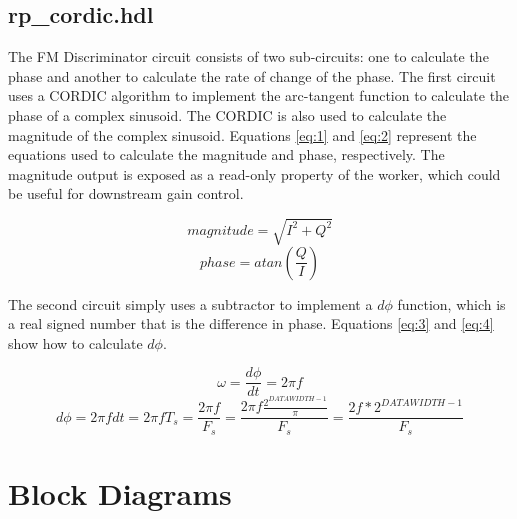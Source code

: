 \documentclass{article}
\def\comp{rp\_cordic}
\begin{document}
\subsection*{\comp.hdl}
The FM Discriminator circuit consists of two sub-circuits: one to calculate the phase and another to calculate the rate of change of the phase. The first circuit uses a CORDIC algorithm to implement the arc-tangent function to calculate the phase of a complex sinusoid. The CORDIC is also used to calculate the magnitude of the complex sinusoid. Equations \ref{eq:1} and \ref{eq:2} represent the equations used to calculate the magnitude and phase, respectively. The magnitude output is exposed as a read-only property of the worker, which could be useful for downstream gain control.

\begin{equation} \label{eq:1}
	magnitude = \sqrt{I^2 + Q^2}
\end{equation}
\begin{equation} \label{eq:2}
	phase = atan(\frac{Q}{I})
\end{equation}

The second circuit simply uses a subtractor to implement a $d\phi$ function, which is a real signed number that is the difference in phase. Equations \ref{eq:3} and \ref{eq:4} show how to calculate $d\phi$.

\begin{equation} \label{eq:3}
	\omega = \frac{d\phi}{dt} = {2 \pi f}
\end{equation}
\begin{equation} \label{eq:4}
	d\phi = {2 \pi f dt} = {2 \pi f T_s} = \frac{2 \pi f}{F_s} = \frac{2 \pi f \frac{2^{DATAWIDTH-1}}{\pi}}{F_s} = \frac{2f*2^{DATAWIDTH-1}}{F_s}
\end{equation}
\newpage

\section*{Block Diagrams}
\end{document}
